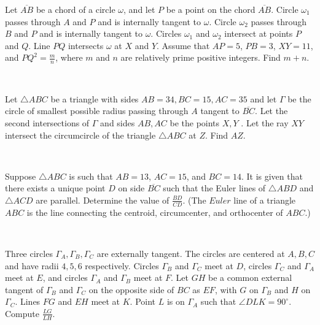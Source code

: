 \documentclass[mast]{lucky}
\begin{document}
\begin{prob}[AIME I 2019/15]{9}
Let $\overline{AB}$ be a chord of a circle $\omega$, and let $P$ be a point on the chord $\overline{AB}$. Circle $\omega_1$ passes through $A$ and $P$ and is internally tangent to $\omega$. Circle $\omega_2$ passes through $B$ and $P$ and is internally tangent to $\omega$. Circles $\omega_1$ and $\omega_2$ intersect at points $P$ and $Q$. Line $PQ$ intersects $\omega$ at $X$ and $Y$. Assume that $AP=5$, $PB=3$, $XY=11$, and $PQ^2 = \tfrac{m}{n}$, where $m$ and $n$ are relatively prime positive integers. Find $m+n$.
\end{prob}\\
\begin{req}[PuMaC 2020 G7]{9}
Let $\triangle ABC$ be a triangle with sides $AB = 34, BC = 15, AC = 35$ and let $\Gamma$ be the circle of smallest possible radius passing through $A$ tangent to $\overline{BC}$. Let the second intersections of $\Gamma$ and sides $AB, AC$ be the points $X, Y$ . Let the ray $XY$ intersect the circumcircle of the triangle $\triangle ABC$ at $Z$. Find $AZ$.
\end{req}\\
\begin{prob}[CMIMC 2017 G10]{9}
Suppose $\triangle ABC$ is such that $AB=13$, $AC=15$, and $BC=14$. It is given that there exists a unique point $D$ on side $\overline{BC}$ such that the Euler lines of $\triangle ABD$ and $\triangle ACD$ are parallel. Determine the value of $\tfrac{BD}{CD}$. (The $\textit{Euler}$ line of a triangle $ABC$ is the line connecting the centroid, circumcenter, and orthocenter of $ABC$.)
\end{prob}\\
\begin{prob}[USMCA 2021/29]{13}
Three circles $\Gamma_A, \Gamma_B, \Gamma_C$ are externally tangent. The circles are centered at $A, B, C$ and have radii $4, 5, 6$ respectively. Circles $\Gamma_B$ and $\Gamma_C$ meet at $D$, circles $\Gamma_C$ and $\Gamma_A$ meet at $E$, and circles $\Gamma_A$ and $\Gamma_B$ meet at $F$. Let $GH$ be a common external tangent of $\Gamma_B$ and $\Gamma_C$ on the opposite side of $BC$ as $EF$, with $G$ on $\Gamma_B$ and $H$ on $\Gamma_C$. Lines $FG$ and $EH$ meet at $K$. Point $L$ is on $\Gamma_A$ such that $\angle DLK = 90^\circ$. Compute $\frac{LG}{LH}$.
\end{prob}
\end{document}
